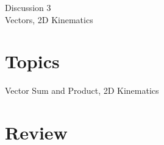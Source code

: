 \documentclass[11pt]{article}
\theoremstyle{gangnamstyle}{\newtheorem{definition}{Definition}[]}
\theoremstyle{gangnamstyle}{\newtheorem{example}{Example}[]}
\theoremstyle{gangnamstyle}{\newtheorem{problem}{Problem}[]}
\begin{document}
\normalfont
\pagestyle{pages}


\begin{center}
\vspace{3in}
{\Large Discussion 3 } \\ [0.05in]
Vectors, 2D Kinematics \\ [-0.5in]
\end{center}

\section*{Topics}
Vector Sum and Product, 2D Kinematics

\section{Review}
\end{document}

